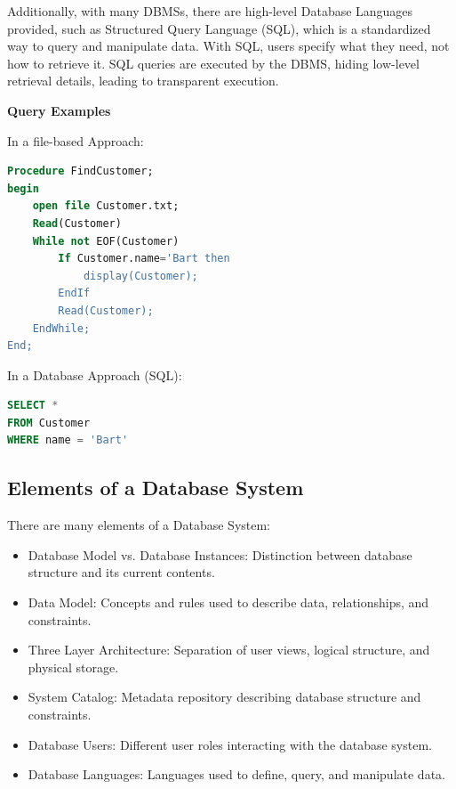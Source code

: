 \documentclass[11pt]{article}
\begin{document}
Additionally, with many DBMSs, there are high-level Database Languages provided, such as Structured Query Language (SQL), which is a standardized way to query and manipulate data. With SQL, users specify what they need, not how to retrieve it. SQL queries are executed by the DBMS, hiding low-level retrieval details, leading to transparent execution.

\vspace{11pt}
\textbf{Query Examples}
\vspace{11pt}

In a file-based Approach:

\vspace{11pt}
\begin{lstlisting}[language=SQL]
Procedure FindCustomer;
begin
    open file Customer.txt;
    Read(Customer)
    While not EOF(Customer)
        If Customer.name='Bart then
            display(Customer);
        EndIf
        Read(Customer);
    EndWhile;
End;
\end{lstlisting}
\vspace{11pt}

In a Database Approach (SQL):
\vspace{11pt}
\begin{lstlisting}[language=SQL]
SELECT *
FROM Customer
WHERE name = 'Bart'
\end{lstlisting}
\vspace{11pt}

\vspace{11pt}
\subsection{Elements of a Database System}
\vspace{11pt}

There are many elements of a Database System:
\begin{itemize}
    \item Database Model vs. Database Instances: Distinction between database structure and its current contents.
    \item Data Model: Concepts and rules used to describe data, relationships, and constraints.
    \item Three Layer Architecture: Separation of user views, logical structure, and physical storage.
    \item System Catalog: Metadata repository describing database structure and constraints.
    \item Database Users: Different user roles interacting with the database system.
    \item Database Languages: Languages used to define, query, and manipulate data.
\end{itemize}
\end{document}
